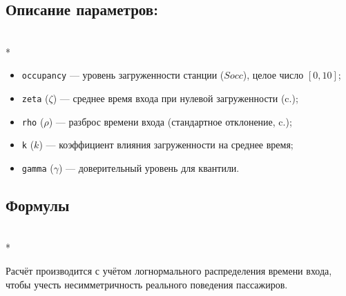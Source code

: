 \documentclass[12pt]{article}
\begin{document}
\subsection*{Описание параметров:}\mbox{}\\*

\begin{itemize}
\item \texttt{occupancy} — уровень загруженности станции ($Socc$), целое число $[0, 10]$;
\item \texttt{zeta} ($\zeta$) — среднее время входа при нулевой загруженности (c.);
\item \texttt{rho} ($\rho$) — разброс времени входа (стандартное отклонение, c.);
\item \texttt{k} ($k$) — коэффициент влияния загруженности на среднее время;
\item \texttt{gamma} ($\gamma$) — доверительный уровень для квантили.
\end{itemize}

\subsection*{Формулы}\mbox{}\\*

Расчёт производится с учётом логнормального распределения времени входа,
чтобы учесть несимметричность реального поведения пассажиров.
\end{document}
